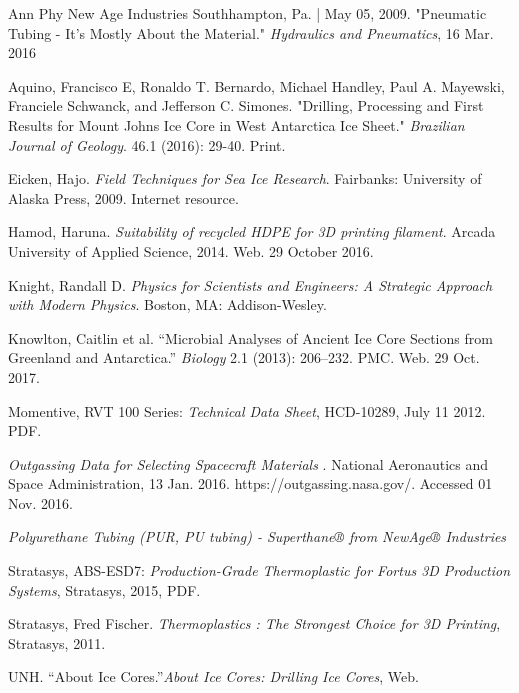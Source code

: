 \documentclass{article}
\begin{document}
\begin{thebibliography}{12}
Ann Phy New Age Industries Southhampton, Pa. | May 05, 2009. "Pneumatic Tubing - It's Mostly About the Material." \textit{Hydraulics and Pneumatics}, 16 Mar. 2016

Aquino, Francisco E, Ronaldo T. Bernardo, Michael Handley, Paul A. Mayewski, Franciele Schwanck, and Jefferson C. Simones. "Drilling, Processing and First Results for Mount Johns Ice Core in West Antarctica Ice Sheet." \textit{Brazilian Journal of Geology}. 46.1 (2016): 29-40. Print.

Eicken, Hajo. \textit{Field Techniques for Sea Ice Research}. Fairbanks: University of Alaska Press, 2009. Internet resource.

Hamod, Haruna. \textit{Suitability of recycled HDPE for 3D printing filament}. Arcada University of Applied Science, 2014. Web. 29 October 2016.

Knight, Randall D. \textit{Physics for Scientists and Engineers: A Strategic Approach with Modern Physics}. Boston, MA: Addison-Wesley.

Knowlton, Caitlin et al. “Microbial Analyses of Ancient Ice Core Sections from Greenland and Antarctica.” \textit{Biology} 2.1 (2013): 206–232. PMC. Web. 29 Oct. 2017.

Momentive, RVT 100 Series: \textit{Technical Data Sheet}, HCD-10289, July 11 2012. PDF.

\textit{Outgassing Data for Selecting Spacecraft Materials} . National Aeronautics and Space Administration, 13 Jan. 2016. https://outgassing.nasa.gov/. Accessed 01 Nov. 2016.

\textit{Polyurethane Tubing (PUR, PU tubing) - Superthane® from NewAge® Industries}

Stratasys, ABS-ESD7: \textit{Production-Grade Thermoplastic for Fortus 3D Production Systems}, Stratasys, 2015, PDF.

Stratasys, Fred Fischer. \textit{Thermoplastics : The Strongest Choice for 3D Printing}, Stratasys, 2011.

UNH. “About Ice Cores.”\textit{About Ice Cores: Drilling Ice Cores}, Web.

\end{thebibliography}
\end{document}

